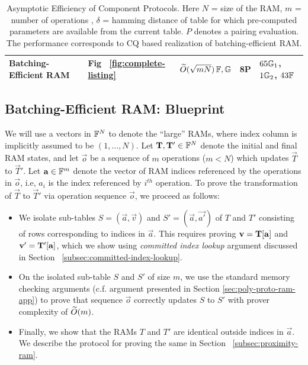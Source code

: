 \begin{table}[bt]
\begin{tabular}{l|l|l|l|l}
        \rowcolor{gray}
        Batching-Efficient RAM                                                                          & Fig  ~\ref{fig:complete-listing}    & $\widetilde{O}(\sqrt{mN})\,\mathbb{F},\mathbb{G}$            & 8P            & $65\mathbb{G}_1$, $1\mathbb{G}_2$, $43\mathbb{F}$  \\ \hline
    \end{tabular}
    \caption{Asymptotic Efficiency of Component Protocols. Here $N$ = size of the RAM, $m$ = number of operations
    , $\delta$ = hamming distance of table for which pre-computed parameters are available from the current table.
    $P$ denotes a pairing evaluation. The performance corresponds to CQ based realization of batching-efficient
    RAM.}
    \label{tbl:efficiency-components}
\end{table}



\subsection{Batching-Efficient RAM: Blueprint}\label{subsec:batching-efficient-ram-blueprint}
We will use a vectors in $\mathbb{F}^N$ to denote the ``large'' RAMs, where index column is implicitly
assumed to be $(1,\ldots,N)$.
Let $\mathbf{T},\mathbf{T'}\in \mathbb{F}^N$ denote the initial and final RAM states, and let $\vec{o}$ be
a sequence of $m$ operations ($m < N$) which updates $\vec{T}$ to $\vec{T}'$. Let $\mathbf{a}\in \mathbb{F}^m$ denote the vector
of RAM indices referenced by the operations in $\vec{o}$, i.e, $a_i$ is the index referenced by $i^{th}$ operation.
To prove the transformation of $\vec{T}$ to $\vec{T}'$ via operation sequence $\vec{o}$, we proceed as follows:
\begin{itemize}[leftmargin=1em, label=-]
    \item We isolate sub-tables $S=(\vec{a},\vec{v})$ and $S'=(\vec{a},\vec{a'})$ of $T$ and $T'$ consisting of
    rows corresponding to indices in $\vec{a}$. This requires proving $\mathbf{v}=\mathbf{T}[\mathbf{a}]$ and $\mathbf{v'}=
    \mathbf{T}'[\mathbf{a}]$, which we show using {\em committed index lookup} argument discussed in Section ~\ref{subsec:committed-index-lookup}.

    \item On the isolated sub-table $S$ and $S'$ of size $m$, we use the standard memory checking arguments (c.f. argument
    presented in Section \ref{sec:poly-proto-ram-app}) to prove that sequence $\vec{o}$ correctly updates $S$ to $S'$ with
    prover complexity of $\widetilde{O}(m)$.

    \item Finally, we show that the RAMs $T$ and $T'$ are identical outside indices in $\vec{a}$. We describe the protocol
    for proving the same in Section ~\ref{subsec:proximity-ram}.
\end{itemize}

